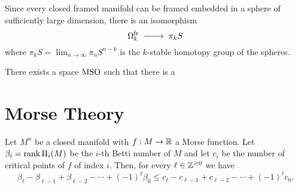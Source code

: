 \begin{corollary}
  Since every closed framed manifold can be framed embedded in a sphere of sufficiently large dimension, there is an isomorphism
  \[
    \Omega^\fr_k \lkxto \pi_k S
  \]
  where $\pi_k S = \lim_{n\to\infty} \pi_n S^{n-k}$ is the $k$-stable homotopy group of the spheres.
\end{corollary}

\begin{theorem}
  There exists a space $\mathrm{MSO}$ such that there is a 
\end{theorem}

\section{Morse Theory}\label{sec:morse-theory}

\begin{theorem}
	Let $M^n$ be a closed manifold with $f : M\to \mathbb{R}$ a Morse function. Let $\beta_i=\operatorname{rank} \operatorname{H}_i(M)$ be the $i$-th Betti number of $M$ and let $c_i$ be the number of critical points of $f$ of index $i$. Then, for every $\ell\in \mathbb{Z}^{\geq 0}$ we have
	\[
		\beta_\ell - \beta_{\ell-1} + \beta_{\ell-2} - \cdots +(-1)^\ell \beta_0 \leq c_\ell - c_{\ell-1} + c_{\ell-2} - \cdots + (-1)^\ell c_0.
	\]
\end{theorem}
